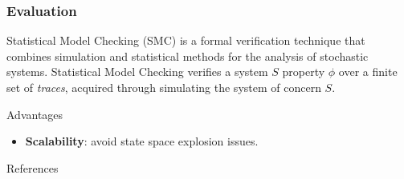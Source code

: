 \documentclass{beamer}
\begin{document}
\begin{frame}
    \frametitle{Evaluation}
    Statistical Model Checking (SMC) is a formal verification technique that combines simulation and statistical methods for the analysis of stochastic systems. \footnotemark[1] Statistical Model Checking verifies a system $S$ property $\phi$ over a finite set of \textit{traces}, acquired through simulating the system of concern $S$.
    \begin{block}{Advantages}
        \begin{itemize}
            \item \textbf{Scalability}: avoid state space explosion issues.
        \end{itemize}
    \end{block}
\end{frame}



\begin{frame}[allowframebreaks]{References}
    \printbibliography
\end{frame}
\end{document}
